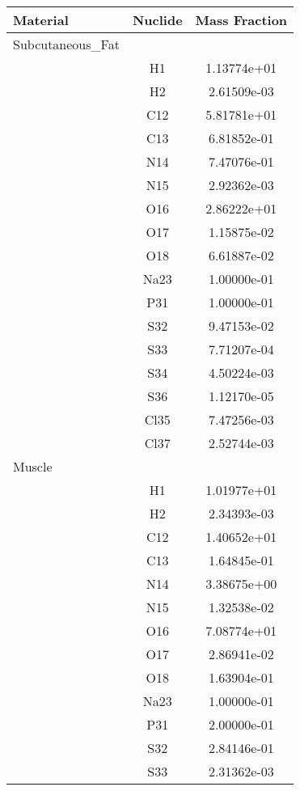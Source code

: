 
\begin{centering}
\begin{longtable}{l c c}%
\toprule
\textbf{Material} & \textbf{Nuclide} & \textbf{Mass Fraction} \\ 
\hline
Subcutaneous_Fat & & \\
\hline
& H1 & 1.13774e+01 \\ 
& H2 & 2.61509e-03 \\ 
& C12 & 5.81781e+01 \\ 
& C13 & 6.81852e-01 \\ 
& N14 & 7.47076e-01 \\ 
& N15 & 2.92362e-03 \\ 
& O16 & 2.86222e+01 \\ 
& O17 & 1.15875e-02 \\ 
& O18 & 6.61887e-02 \\ 
& Na23 & 1.00000e-01 \\ 
& P31 & 1.00000e-01 \\ 
& S32 & 9.47153e-02 \\ 
& S33 & 7.71207e-04 \\ 
& S34 & 4.50224e-03 \\ 
& S36 & 1.12170e-05 \\ 
& Cl35 & 7.47256e-03 \\ 
& Cl37 & 2.52744e-03 \\ 
\hline
Muscle & & \\
\hline
& H1 & 1.01977e+01 \\ 
& H2 & 2.34393e-03 \\ 
& C12 & 1.40652e+01 \\ 
& C13 & 1.64845e-01 \\ 
& N14 & 3.38675e+00 \\ 
& N15 & 1.32538e-02 \\ 
& O16 & 7.08774e+01 \\ 
& O17 & 2.86941e-02 \\ 
& O18 & 1.63904e-01 \\ 
& Na23 & 1.00000e-01 \\ 
& P31 & 2.00000e-01 \\ 
& S32 & 2.84146e-01 \\ 
& S33 & 2.31362e-03 \\ 

\end{longtable}
\end{centering}
